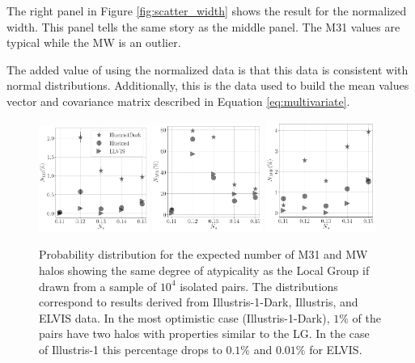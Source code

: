 \documentclass[a4paper,fleqn,usenatbib]{mnras}
\begin{document}
The right panel in Figure \ref{fig:scatter_width} shows the result for
the normalized width.  
This panel tells the same story as the middle panel. 
The M31 values are typical while the MW is an outlier. 

The added value of using the normalized data is that this data is 
consistent with normal distributions.
Additionally, this is the data used to build the mean values vector and covariance
matrix described in Equation \ref{eq:multivariate}. 



\begin{figure}
\centering
\includegraphics[width=0.32\textwidth]{LG_numbers.pdf}
\includegraphics[width=0.32\textwidth]{M31_numbers.pdf}
\includegraphics[width=0.32\textwidth]{MW_numbers.pdf}
\caption{Probability distribution for the expected number of M31 and
  MW halos showing the same degree of atypicality as the Local Group if drawn
  from a sample of $10^4$ isolated pairs. 
  The distributions correspond to results derived from Illustris-1-Dark, Illustris,
  and ELVIS data.
  In the most optimistic case (Illustris-1-Dark), $1\%$ of the pairs have
  two halos with properties similar to the LG. 
  In the case of Illustris-1 this percentage drops to $0.1\%$ and
  $0.01\%$ for ELVIS. 
\label{fig:expected_number}}
\end{figure}
\end{document}
